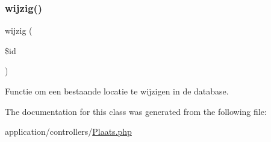 \mbox{\label{class_plaats_aa10f6589c4f171a54524ed6758bed97f}} 
\subsubsection{\texorpdfstring{wijzig()}{wijzig()}}
{\footnotesize\ttfamily wijzig (\begin{DoxyParamCaption}\item[{}]{\$id }\end{DoxyParamCaption})}



Functie om een bestaande locatie te wijzigen in de database. 



The documentation for this class was generated from the following file\+:\begin{DoxyCompactItemize}
\item 
application/controllers/\mbox{\hyperlink{_plaats_8php}{Plaats.\+php}}\end{DoxyCompactItemize}
